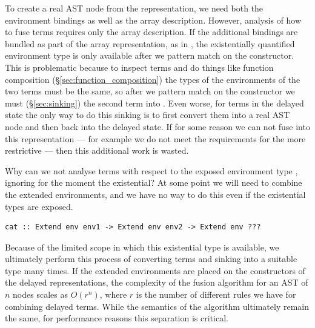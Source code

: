To create a real AST node from the 
representation, we need both the environment bindings as well as the array
description. However, analysis of how to fuse terms requires only the array
description. If the additional bindings are bundled as part of the array
representation, as in , the existentially quantified environment
type is only available after we pattern match on the constructor. This is
problematic because to inspect terms and do things like function composition
(\S\ref{sec:function_composition}) the types of the environments of the two
terms must be the same, so after we pattern match on the constructor we must
 (\S\ref{sec:sinking}) the second term into . Even worse,
for terms in the delayed state the only way to do this sinking is to first
convert them into a real AST node and then back into the delayed state. If for
some reason we can not fuse into this representation --- for example we do not
meet the requirements for the more restrictive  --- then this
additional work is wasted.

Why can we not analyse terms with respect to the exposed environment type
, ignoring for the moment the existential? At some point we will need
to combine the extended environments, and we have no way to do this even if the
existential types are exposed.
%
\begin{lstlisting}[style=haskell]
cat :: Extend env env1 -> Extend env env2 -> Extend env ???
\end{lstlisting}

Because of the limited scope in which this existential type is available, we
ultimately perform this process of converting terms and sinking into a suitable
type many times. If the extended environments are placed on the constructors of
the delayed representations, the complexity of the fusion algorithm for an AST
of $n$ nodes scales as $O(r^n)$, where $r$ is the number of different rules we
have for combining delayed terms. While the semantics of the algorithm
ultimately remain the same, for performance reasons this separation is critical.

